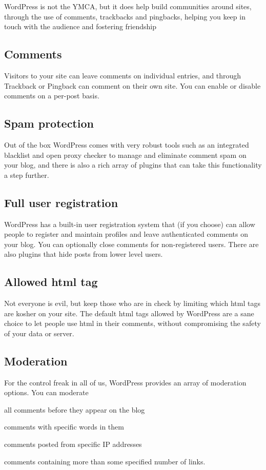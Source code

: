 WordPress is not the YMCA, but it does help build communities around sites, through the use of comments, trackbacks and pingbacks, helping you keep in touch with the audience and fostering friendship

\subsection{Comments}

Visitors to your site can leave comments on individual entries, and through Trackback or Pingback can comment on their own site. You can enable or disable comments on a per-post basis.

\subsection{Spam protection}

Out of the box WordPress comes with very robust tools such as an integrated blacklist and open proxy checker to manage and eliminate comment spam on your blog, and there is also a rich array of plugins that can take this functionality a step further.

\subsection{Full user registration}

WordPress has a built-in user registration system that (if you choose) can allow people to register and maintain profiles and leave authenticated comments on your blog. You can optionally close comments for non-registered users. There are also plugins that hide posts from lower level users.

\subsection{Allowed html tag}

Not everyone is evil, but keep those who are in check by limiting which html tags are kosher on your site. The default html tags allowed by WordPress are a sane choice to let people use html in their comments, without compromising the safety of your data or server.

\subsection{Moderation}

For the control freak in all of us, WordPress provides an array of moderation options. You can moderate
\begin{compactitem}
\item all comments before they appear on the blog
\item comments with specific words in them
\item comments posted from specific IP addresses
\item comments containing more than some specified number of links.
\end{compactitem}

